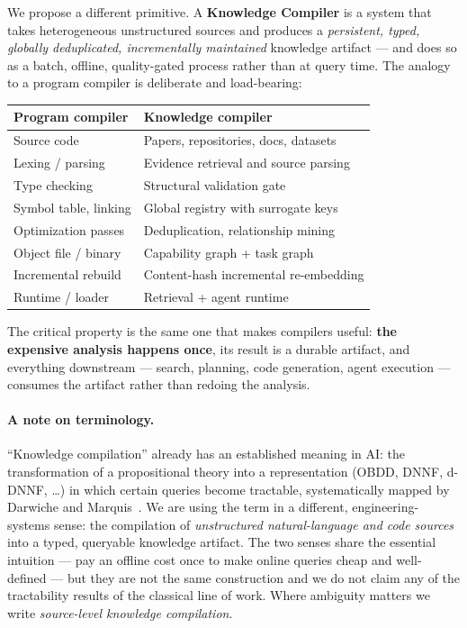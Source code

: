 \documentclass[10pt,a4paper]{article}
\begin{document}
We propose a different primitive. A \textbf{Knowledge Compiler} is a system that
takes heterogeneous unstructured sources and produces a \emph{persistent, typed,
globally deduplicated, incrementally maintained} knowledge artifact --- and does
so as a batch, offline, quality-gated process rather than at query time. The
analogy to a program compiler is deliberate and load-bearing:

\begin{center}
\begin{tabular}{@{}ll@{}}
\toprule
\textbf{Program compiler} & \textbf{Knowledge compiler} \\
\midrule
Source code & Papers, repositories, docs, datasets \\
Lexing / parsing & Evidence retrieval and source parsing \\
Type checking & Structural validation gate \\
Symbol table, linking & Global registry with surrogate keys \\
Optimization passes & Deduplication, relationship mining \\
Object file / binary & Capability graph + task graph \\
Incremental rebuild & Content-hash incremental re-embedding \\
Runtime / loader & Retrieval + agent runtime \\
\bottomrule
\end{tabular}
\end{center}

\noindent The critical property is the same one that makes compilers useful:
\textbf{the expensive analysis happens once}, its result is a durable artifact,
and everything downstream --- search, planning, code generation, agent
execution --- consumes the artifact rather than redoing the analysis.

\paragraph{A note on terminology.} ``Knowledge compilation'' already has an
established meaning in AI: the transformation of a propositional theory into a
representation (OBDD, DNNF, d-DNNF, \ldots) in which certain queries become
tractable, systematically mapped by Darwiche and Marquis~\cite{darwiche2002kcmap}.
We are using the term in a different, engineering-systems sense: the compilation
of \emph{unstructured natural-language and code sources} into a typed, queryable
knowledge artifact. The two senses share the essential intuition --- pay an
offline cost once to make online queries cheap and well-defined --- but they are
not the same construction and we do not claim any of the tractability results of
the classical line of work. Where ambiguity matters we write \emph{source-level
knowledge compilation}.
\end{document}
